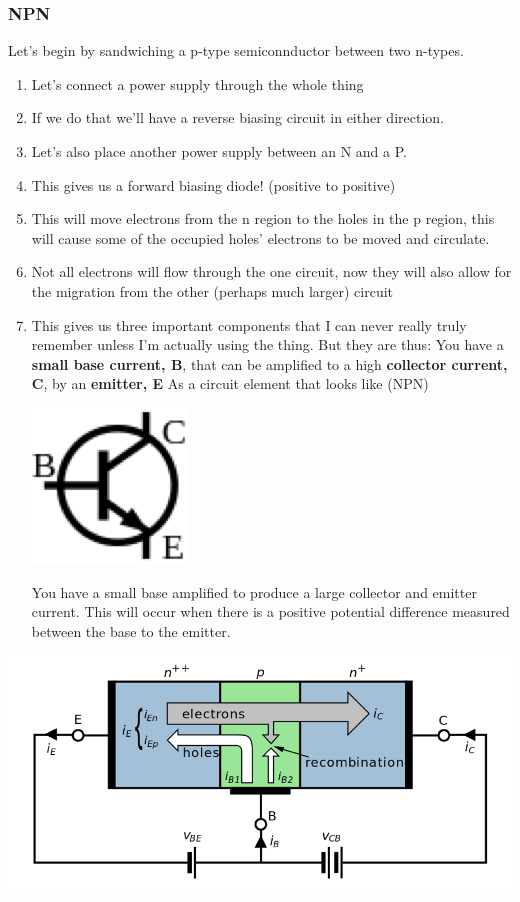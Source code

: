 \documentclass[11pt]{book}
\begin{document}
\subsubsection{NPN}
Let's begin by sandwiching a p-type semiconnductor between two n-types.
\begin{enumerate}
	\item Let's connect a power supply through the whole thing
	\item If we do that we’ll have a reverse biasing circuit in either direction.
	\item Let's also place another power supply between an N and a P.
	\item This gives us a forward biasing diode! (positive to positive)
	\item This will move electrons from the n region to the holes in the p region, this will cause some of the occupied holes’ electrons to be moved and circulate.
	\item Not all electrons will flow through the one circuit, now they will also allow for the migration from the other (perhaps much larger) circuit 
	\item This gives us three important components that I can never really truly remember unless I’m actually using the thing. But they are thus:
	\subitem You have a \textbf{small base current, B}, that can be amplified to a high \textbf{collector current, C}, by an \textbf{emitter, E}
	\subitem As a circuit element that looks like (NPN)
 	\begin{center}
		\includegraphics{figures/20.19.png}
	\end{center}
	\subitem You have a small base amplified to produce a large collector and emitter current. This will occur when there is a positive potential difference measured between the base to the emitter.
\end{enumerate}
\begin{center}
	\includegraphics[width = \textwidth]{figures/20.20.png}
\end{center}
\end{document}
